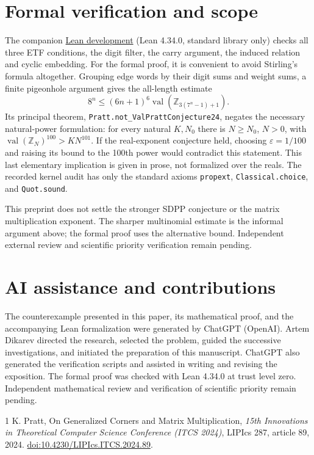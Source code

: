 \documentclass[11pt,a4paper]{article}
\newcommand{\val}{\operatorname{val}}
\newcommand{\Z}{\mathbb Z}
\begin{document}
\section{Formal verification and scope}
The companion \href{https://github.com/Atm4x/my-ai-math-results/tree/main/pratt-conjecture-24/lean}{Lean development} (Lean 4.34.0, standard library only) checks all three ETF conditions, the digit filter, the carry argument, the induced relation and cyclic embedding. For the formal proof, it is convenient to avoid Stirling's formula altogether. Grouping edge words by their digit sums and weight sums, a finite pigeonhole argument gives the all-length estimate
\[
8^n\le (6n+1)^6\val(\Z_{3(7^n-1)+1}).
\]
Its principal theorem, \texttt{Pratt.not\_ValPrattConjecture24}, negates the necessary natural-power formulation: for every natural $K,N_0$ there is $N\ge N_0$, $N>0$, with $\val(\Z_N)^{100}>K N^{101}$. If the real-exponent conjecture held, choosing $\varepsilon=1/100$ and raising its bound to the 100th power would contradict this statement. This last elementary implication is given in prose, not formalized over the reals. The recorded kernel audit has only the standard axioms \texttt{propext}, \texttt{Classical.choice}, and \texttt{Quot.sound}.

This preprint does not settle the stronger SDPP conjecture or the matrix multiplication exponent. The sharper multinomial estimate is the informal argument above; the formal proof uses the alternative bound. Independent external review and scientific priority verification remain pending.
\section*{AI assistance and contributions}
The counterexample presented in this paper, its mathematical proof, and the accompanying Lean formalization were generated by ChatGPT (OpenAI). Artem Dikarev directed the research, selected the problem, guided the successive investigations, and initiated the preparation of this manuscript. ChatGPT also generated the verification scripts and assisted in writing and revising the exposition. The formal proof was checked with Lean 4.34.0 at trust level zero. Independent mathematical review and verification of scientific priority remain pending.
\begin{thebibliography}{1}
 K. Pratt, On Generalized Corners and Matrix Multiplication, \emph{15th Innovations in Theoretical Computer Science Conference (ITCS 2024)}, LIPIcs 287, article 89, 2024. \href{https://doi.org/10.4230/LIPIcs.ITCS.2024.89}{doi:10.4230/LIPIcs.ITCS.2024.89}.
\end{thebibliography}
\end{document}
